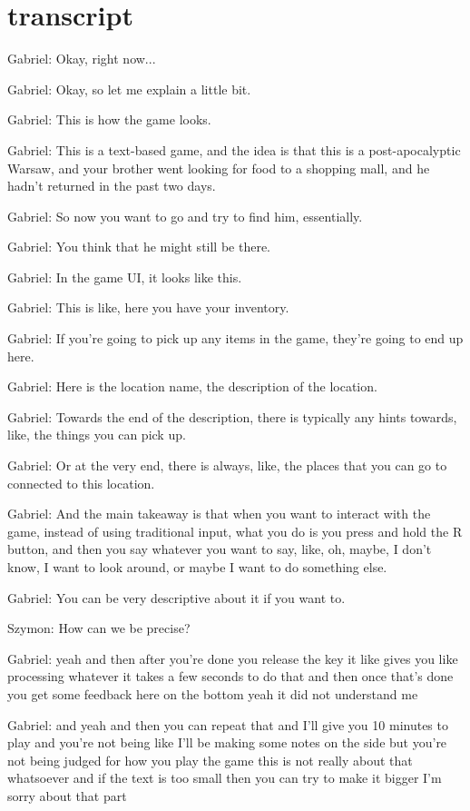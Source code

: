 
\section{transcript}

Gabriel: Okay, right now...

Gabriel: Okay, so let me explain a little bit.

Gabriel: This is how the game looks.

Gabriel: This is a text-based game, and the idea is that this is a post-apocalyptic Warsaw, and your brother went looking for food to a shopping mall, and he hadn't returned in the past two days.

Gabriel: So now you want to go and try to find him, essentially.

Gabriel: You think that he might still be there.

Gabriel: In the game UI, it looks like this.

Gabriel: This is like, here you have your inventory.

Gabriel: If you're going to pick up any items in the game, they're going to end up here.

Gabriel: Here is the location name, the description of the location.

Gabriel: Towards the end of the description, there is typically any hints towards, like, the things you can pick up.

Gabriel: Or at the very end, there is always, like, the places that you can go to connected to this location.

Gabriel: And the main takeaway is that when you want to interact with the game, instead of using traditional input, what you do is you press and hold the R button, and then you say whatever you want to say, like, oh, maybe, I don't know, I want to look around, or maybe I want to do something else.

Gabriel: You can be very descriptive about it if you want to.

Szymon: How can we be precise?

Gabriel: yeah and then after you're done you release the key it like gives you like processing whatever it takes a few seconds to do that and then once that's done you get some feedback here on the bottom yeah it did not understand me

Gabriel: and yeah and then you can repeat that and I'll give you 10 minutes to play and you're not being like I'll be making some notes on the side but you're not being judged for how you play the game this is not really about that whatsoever and if the text is too small then you can try to make it bigger I'm sorry about that part

